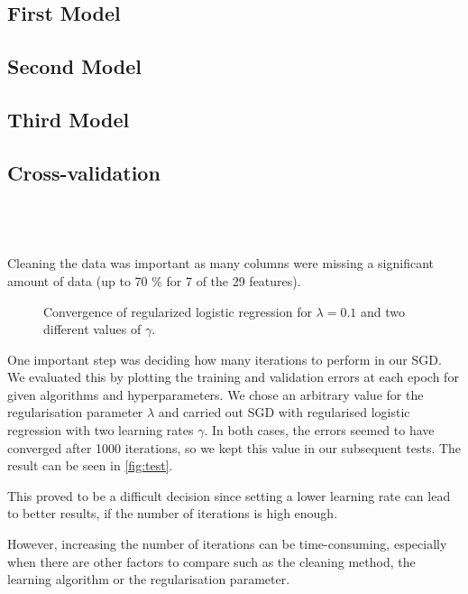 \documentclass[10pt,conference,compsocconf]{IEEEtran}
\begin{document}
\subsection{First Model}

\subsection{Second Model}

\subsection{Third Model}

\subsection{Cross-validation}

\\ \\ \\

Cleaning the data was important as many columns were missing a significant amount of data (up to 70 \% for 7 of the 29 features).

\begin{figure}
  \centering
  
  \vspace{-3mm}
  \caption{Convergence of regularized logistic regression for $\lambda = 0.1$ and two
  different values of $\gamma$.}
  \label{fig:test}
\end{figure}


One important step was deciding how many iterations to perform in our
SGD. We evaluated this by plotting the training and validation errors
at each epoch for given algorithms and hyperparameters.
We chose an arbitrary value for the regularisation parameter $\lambda$ and carried out SGD with regularised logistic regression with two learning rates $\gamma$.
In both cases, the errors seemed to have converged after 1000 iterations, so we kept this value in our subsequent tests.
The result can
be seen in \autoref{fig:test}.

This proved to be a difficult decision since setting a lower learning rate can lead to better results,
if the number of iterations is high enough.

However, increasing the number of iterations can be
time-consuming, especially when there are other
factors to compare such as the cleaning method, the learning algorithm or 
the regularisation parameter.
\end{document}
